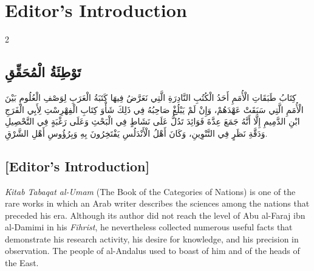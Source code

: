 \documentclass[11pt,a4paper]{article}
\newcommand{\ar}[1]{\arabicfont\beginR #1\endR}
\begin{document}
\clearpage

\tableofcontents
\clearpage

\section*{Editor's Introduction}

\begin{paracol}{2}
\sloppy

\begin{leftcolumn}
\subsection*{\ar{تَوْطِئَةُ الْمُحَقِّقِ}}
\vspace{0.3cm}
{\arabicfont\beginR
كِتَابُ طَبَقَاتِ الْأُمَمِ أَحَدُ الْكُتُبِ النَّادِرَةِ الَّتِي نَعَرَّضُ فِيهَا كَتَبَةُ الْعَرَبِ لِوَصْفِ الْعُلُومِ بَيْنَ الْأُمَمِ الَّتِي سَبَقَتْ عَهْدَهُمْ، وَإِنْ لَمْ يَبْلُغْ صَاحِبُهُ فِي ذَلِكَ شَأْوَ كِتَابِ الْفِهْرِسْتِ لِأَبِي الْفَرَجِ ابْنِ الدَّمِيمِ إِلَّا أَنَّهُ جَمَعَ عِدَّةَ فَوَائِدَ تَدُلُّ عَلَى نَشَاطٍ فِي الْبَحْثِ وَعَلَى رَغْبَةٍ فِي التَّحْصِيلِ وَدَقَّةِ نَظَرٍ فِي التَّنْوِينِ، وَكَانَ أَهْلُ الْأَنْدَلُسِ يَفْتَخِرُونَ بِهِ وَبِرُؤُوسِ أَهْلِ الشَّرْقِ.
\endR}
\end{leftcolumn}

\begin{rightcolumn}
\subsection*{[Editor's Introduction]}
\vspace{0.3cm}
\textit{Kitab Tabaqat al-Umam} (The Book of the Categories of Nations) is one of the rare works in which an Arab writer describes the sciences among the nations that preceded his era. Although its author did not reach the level of Abu al-Faraj ibn al-Damimi in his \textit{Fihrist}, he nevertheless collected numerous useful facts that demonstrate his research activity, his desire for knowledge, and his precision in observation. The people of al-Andalus used to boast of him and of the heads of the East.
\end{rightcolumn}


\end{paracol}
\end{document}
